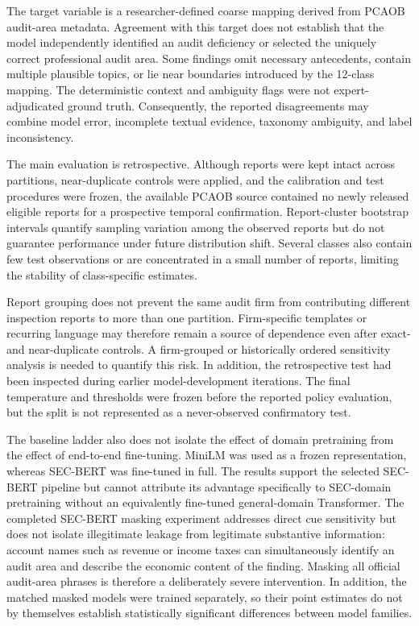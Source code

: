 \documentclass[11pt]{article}
\begin{document}
The target variable is a researcher-defined coarse mapping derived from PCAOB
audit-area metadata. Agreement with this target does not establish that the
model independently identified an audit deficiency or selected the uniquely
correct professional audit area. Some findings omit necessary antecedents,
contain multiple plausible topics, or lie near boundaries introduced by the
12-class mapping. The deterministic context and ambiguity flags were not
expert-adjudicated ground truth. Consequently, the reported disagreements may
combine model error, incomplete textual evidence, taxonomy ambiguity, and label
inconsistency.

The main evaluation is retrospective. Although reports were kept intact across
partitions, near-duplicate controls were applied, and the calibration and test
procedures were frozen, the available PCAOB source contained no newly released
eligible reports for a prospective temporal confirmation. Report-cluster
bootstrap intervals quantify sampling variation among the observed reports but
do not guarantee performance under future distribution shift. Several classes
also contain few test observations or are concentrated in a small number of
reports, limiting the stability of class-specific estimates.

Report grouping does not prevent the same audit firm from contributing different
inspection reports to more than one partition. Firm-specific templates or
recurring language may therefore remain a source of dependence even after exact-
and near-duplicate controls. A firm-grouped or historically ordered sensitivity
analysis is needed to quantify this risk. In addition, the retrospective test had
been inspected during earlier model-development iterations. The final temperature
and thresholds were frozen before the reported policy evaluation, but the split
is not represented as a never-observed confirmatory test.

The baseline ladder also does not isolate the effect of domain pretraining from
the effect of end-to-end fine-tuning. MiniLM was used as a frozen representation,
whereas SEC-BERT was fine-tuned in full. The results support the selected
SEC-BERT pipeline but cannot attribute its advantage specifically to SEC-domain
pretraining without an equivalently fine-tuned general-domain Transformer. The
completed SEC-BERT masking experiment addresses direct cue sensitivity but does
not isolate illegitimate leakage from legitimate substantive information:
account names such as revenue or income taxes can simultaneously identify an
audit area and describe the economic content of the finding. Masking all official
audit-area phrases is therefore a deliberately severe intervention. In addition,
the matched masked models were trained separately, so their point estimates do
not by themselves establish statistically significant differences between model
families.
\end{document}
